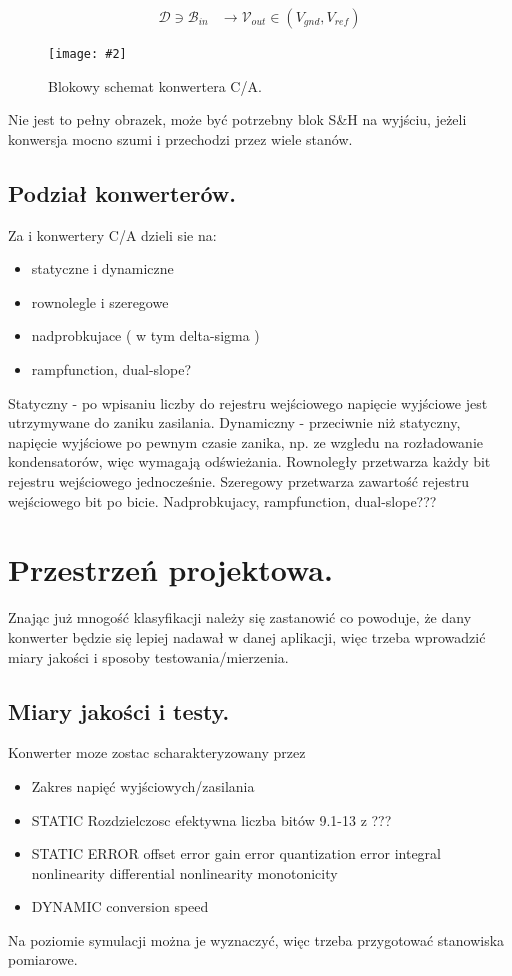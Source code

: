 \documentclass[10pt,a4paper]{report}
\newcommand{\img}[4]{
	\begin{figure}[H]
		\begin{center}
			\texttt{[image: \#2]}
			\caption{#3}
			\label{#4}
		\end{center}
	\end{figure}
}
\begin{document}
	\begin{align}
	\mathcal{D} \ni  \mathcal{B}_{in} &\to \mathcal{V}_{out} \in \left(V_{gnd}, V_{ref} \right)
	\end{align}
	
	
	\img{20}{../visio/blokschkonca.pdf}{Blokowy schemat konwertera C/A.}{blokschkonca}
	
	Nie jest to pełny obrazek, może być potrzebny blok S\&H na wyjściu, jeżeli konwersja mocno szumi i przechodzi przez wiele stanów.
	
	\subsection{Podział konwerterów.}
	Za \cite{cmosanal} i \cite{integconv} konwertery C/A dzieli sie na:
	\begin{itemize}
		\item statyczne i dynamiczne
		\item rownolegle i szeregowe
		\item nadprobkujace ( w tym delta-sigma )
		\item rampfunction, dual-slope?
	\end{itemize}
	Statyczny - po wpisaniu liczby do rejestru wejściowego napięcie wyjściowe jest utrzymywane do zaniku zasilania.
	Dynamiczny - przeciwnie niż statyczny, napięcie wyjściowe po pewnym czasie zanika, np. ze wzgledu na rozładowanie kondensatorów, więc wymagają odświeżania.
	Rownoległy przetwarza każdy bit rejestru wejściowego jednocześnie.
	Szeregowy przetwarza zawartość rejestru wejściowego bit po bicie.
	Nadprobkujacy, rampfunction, dual-slope???
	
	
	\section{Przestrzeń projektowa.}
	Znając już mnogość klasyfikacji należy się zastanowić co powoduje, że dany konwerter będzie się lepiej nadawał w danej aplikacji, więc trzeba wprowadzić miary jakości i sposoby testowania/mierzenia.
	\subsection{Miary jakości i testy.}
	Konwerter moze zostac scharakteryzowany przez
	\begin{itemize}
		\item Zakres napięć wyjściowych/zasilania
		\item STATIC 
		\subitem Rozdzielczosc
		\subitem efektywna liczba bitów 9.1-13 z \cite{cmosanal} ???
		\item STATIC ERROR
		\subitem offset error
		\subitem gain error
		\subitem quantization error
		\subitem integral nonlinearity
		\subitem differential nonlinearity
		\subitem monotonicity
		\item DYNAMIC
		\subitem conversion speed
		\subitem 
	\end{itemize}
	Na poziomie symulacji można je wyznaczyć, więc trzeba przygotować stanowiska pomiarowe.
	
\end{document}
